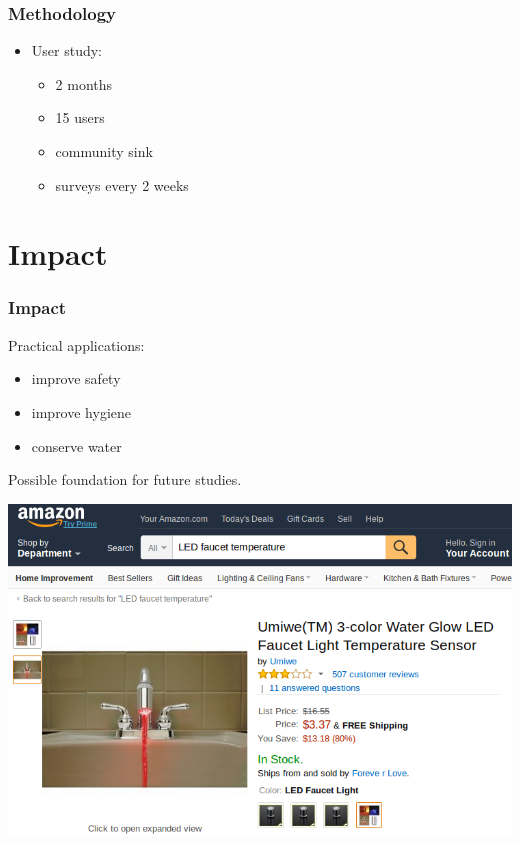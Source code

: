 \documentclass{beamer}
\begin{document}
\begin{frame}
  \frametitle{Methodology}
  \begin{itemize}
  \item User study: 
    \begin{itemize}
    \item 2 months
    \item 15 users
    \item community sink
    \item surveys every 2 weeks
    \end{itemize}
  \end{itemize}          
\end{frame}



\section{Impact}
\begin{frame}
	\frametitle{Impact}
        Practical applications:
	\begin{itemize}
	  \item improve safety
          \item improve hygiene
          \item conserve water
        \end{itemize} 
        Possible foundation for future studies.
\end{frame}

\begin{frame}
        \includegraphics[width=\textwidth]{Bilder/faucet1.png}
        
\end{frame}
\end{document}
